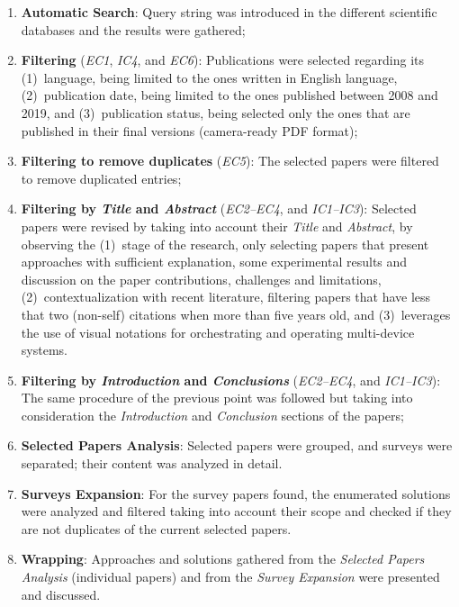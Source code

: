\begin{enumerate}
    \item \textbf{Automatic Search}: Query string was introduced in the different scientific databases and the results were gathered;
    \item \textbf{Filtering} (\textit{EC1}, \textit{IC4}, and \textit{EC6}): Publications were selected regarding its (1)~language, being limited to the ones written in English language, (2)~publication date, being limited to the ones published between 2008 and 2019, and (3)~publication status, being selected only the ones that are published in their final versions (camera-ready PDF format);
    \item \textbf{Filtering to remove duplicates} (\textit{EC5}):  The selected papers were filtered to remove duplicated entries;
    \item \textbf{Filtering by \textit{Title} and \textit{Abstract}} (\textit{EC2--EC4}, and \textit{IC1--IC3}): Selected papers were revised by taking into account their \textit{Title} and \textit{Abstract}, by observing the (1)~stage of the research, only selecting papers that present approaches with sufficient explanation, some experimental results and discussion on the paper contributions, challenges and limitations, (2)~contextualization with recent literature, filtering papers that have less that two (non-self) citations when more than five years old, and (3)~leverages the use of visual notations for orchestrating and operating multi-device systems.
    \item \textbf{Filtering by \textit{Introduction} and \textit{Conclusions}} (\textit{EC2--EC4}, and \textit{IC1--IC3}): The same procedure of the previous point was followed but taking into consideration the \textit{Introduction} and \textit{Conclusion} sections of the papers;
    \item \textbf{Selected Papers Analysis}: Selected papers were grouped, and surveys were separated;  their content was analyzed in detail.
    \item \textbf{Surveys Expansion}: For the survey papers found, the enumerated solutions were analyzed and filtered taking into account their scope
    and checked if they are not duplicates of the current selected papers. 
    \item \textbf{Wrapping}: Approaches and solutions gathered from the \textit{Selected Papers Analysis} (individual papers) and from the \textit{Survey Expansion} were presented and discussed.
\end{enumerate}

